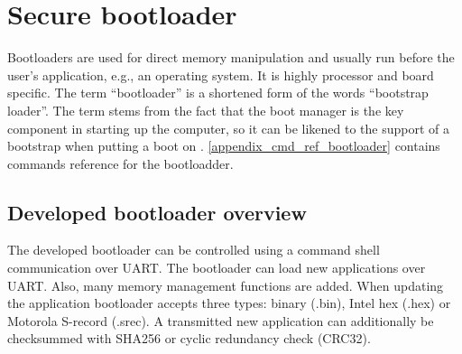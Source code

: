 \chapter{Secure bootloader} %
\label{custom_bootloader}

Bootloaders are used for direct memory manipulation and usually run before the user's application, e.g., an operating system. It is highly processor and board specific. The term “bootloader” is a shortened form of the words “bootstrap loader”. The term stems from the fact that the boot manager is the key component in starting up the computer, so it can be likened to the support of a bootstrap when putting a boot on \citep{bootloader_intro}. \autoref{appendix_cmd_ref_bootloader} contains commands reference for the bootloadder.

\section{Developed bootloader overview}

The developed bootloader can be controlled using a command shell communication over UART. The bootloader can load new applications over UART. Also, many memory management functions are added. When updating the application bootloader accepts three types: binary (.bin), Intel hex (.hex) or Motorola S-record (.srec). A transmitted new application can additionally be checksummed with SHA256 or cyclic redundancy check (CRC32).

